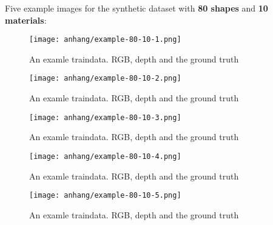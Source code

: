 	\FloatBarrier
	\clearpage
	Five example images for the synthetic dataset with \textbf{80 shapes} and \textbf{10 materials}:
	\begin{figure}[H]
		\centering
		\texttt{[image: anhang/example-80-10-1.png]}
		\caption[An examle traindata. RGB, depth and the ground truth]{An examle traindata. RGB, depth and the ground truth}
	\end{figure}
	\begin{figure}[H]
		\centering
		\texttt{[image: anhang/example-80-10-2.png]}
		\caption[An examle traindata. RGB, depth and the ground truth]{An examle traindata. RGB, depth and the ground truth}
	\end{figure}
	\begin{figure}[H]
		\centering
		\texttt{[image: anhang/example-80-10-3.png]}
		\caption[An examle traindata. RGB, depth and the ground truth]{An examle traindata. RGB, depth and the ground truth}
	\end{figure}
	\begin{figure}[H]
		\centering
		\texttt{[image: anhang/example-80-10-4.png]}
		\caption[An examle traindata. RGB, depth and the ground truth]{An examle traindata. RGB, depth and the ground truth}
	\end{figure}
	\begin{figure}[H]
		\centering
		\texttt{[image: anhang/example-80-10-5.png]}
		\caption[An examle traindata. RGB, depth and the ground truth]{An examle traindata. RGB, depth and the ground truth}
	\end{figure}
	
